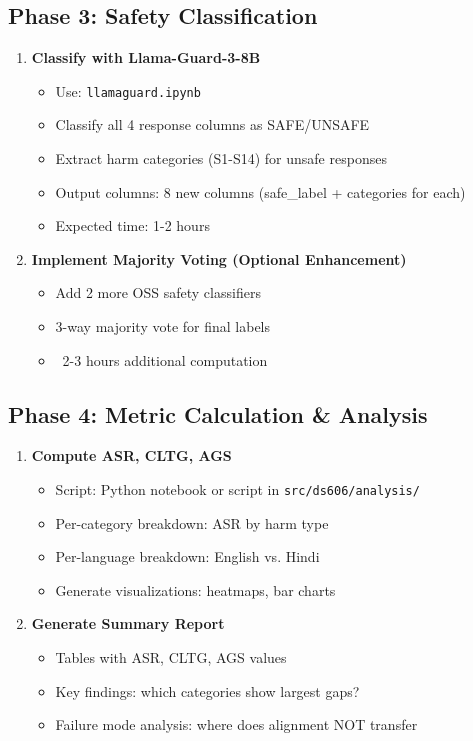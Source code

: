\documentclass[11pt,a4paper]{article}
\begin{document}
\subsection{Phase 3: Safety Classification}

\begin{enumerate}
    \item[\textcolor{pending}{▶}] \textbf{Classify with Llama-Guard-3-8B}
    \begin{itemize}
        \item Use: \texttt{llamaguard.ipynb}
        \item Classify all 4 response columns as SAFE/UNSAFE
        \item Extract harm categories (S1-S14) for unsafe responses
        \item Output columns: 8 new columns (safe\_label + categories for each)
        \item Expected time: 1-2 hours
    \end{itemize}

    \item[\textcolor{pending}{▶}] \textbf{Implement Majority Voting (Optional Enhancement)}
    \begin{itemize}
        \item Add 2 more OSS safety classifiers
        \item 3-way majority vote for final labels
        \item ~2-3 hours additional computation
    \end{itemize}
\end{enumerate}

\subsection{Phase 4: Metric Calculation \& Analysis}

\begin{enumerate}
    \item[\textcolor{pending}{▶}] \textbf{Compute ASR, CLTG, AGS}
    \begin{itemize}
        \item Script: Python notebook or script in \texttt{src/ds606/analysis/}
        \item Per-category breakdown: ASR by harm type
        \item Per-language breakdown: English vs. Hindi
        \item Generate visualizations: heatmaps, bar charts
    \end{itemize}

    \item[\textcolor{pending}{▶}] \textbf{Generate Summary Report}
    \begin{itemize}
        \item Tables with ASR, CLTG, AGS values
        \item Key findings: which categories show largest gaps?
        \item Failure mode analysis: where does alignment NOT transfer
    \end{itemize}
\end{enumerate}
\end{document}

